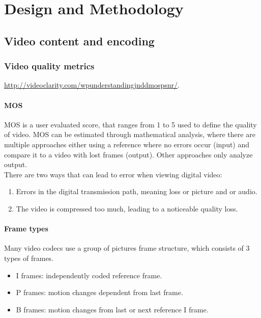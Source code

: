 \chapter{Design and Methodology}
\label{cha:design-and-method}

\section{Video content and encoding}

\subsection{Video quality metrics}
\url{http://videoclarity.com/wpunderstandingjnddmospsnr/}. 

\subsubsection{\ac{MOS}}
MOS is a user evaluated score, that ranges from 1 to 5 used to define the quality of video. MOS can be estimated through mathematical analysis, where there are multiple approaches either using a reference where no errors occur (input) and compare it to a video with lost frames (output). Other approaches only analyze output.\\
There are two ways that can lead to error when viewing digital video:
\begin{enumerate}
    \item Errors in the digital transmission path, meaning loss or picture and or audio.
    \item The video is compressed too much, leading to a noticeable quality loss.
\end{enumerate}

\subsubsection{Frame types}
Many video codecs use a group of pictures frame structure, which consists of 3 types of frames.

\begin{itemize}
    \item I frames: independently coded reference frame.
    \item P frames: motion changes dependent from last frame.
    \item B frames: motion changes from last or next reference I frame.
\end{itemize}

